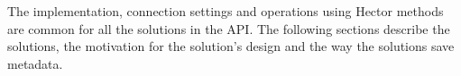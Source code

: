 		
		The implementation,  connection settings and operations using
		Hector methods are common for all the solutions in the \ac{API}.  
		The following sections describe the solutions,  the motivation for the
		solution's design and the way the solutions save metadata. 
		
	
